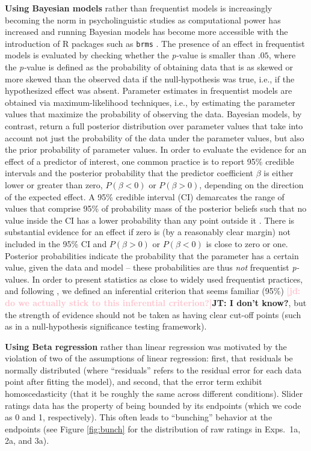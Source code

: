 \documentclass[11pt,fleqn]{article}
\newcommand{\jd}[1]{\textbf{\textcolor{Pink}{[jd: #1]}}}
\newcommand{\6}{\mbox{$[\hspace*{-.6mm}[$}}
\newcommand{\9}{\mbox{$]\hspace*{-.6mm}]$}}
\newcommand{\jt}[1]{\textbf{\color{blue}JT: #1}}
\begin{document}
\textbf{Using Bayesian models} rather than frequentist models is increasingly becoming the norm in psycholinguistic studies as computational power has increased and running Bayesian models has become more accessible with the introduction of R packages such as \verb|brms| \citep{buerkner2017}. The presence of an effect in frequentist models is evaluated by checking whether the {\em p-}value is smaller than $.05$, where the {\em p-}value is defined as the probability of obtaining data that is as skewed or more skewed than the observed data if the null-hypothesis was true, i.e., if the hypothesized effect was absent. Parameter estimates in frequentist models are obtained via maximum-likelihood techniques, i.e., by estimating the parameter values that maximize the probability of observing the data. Bayesian models, by contrast, return a full posterior distribution over parameter values that take into account not just the probability of the data under the parameter values, but also the prior probability of parameter values. In order to evaluate the evidence for an effect of a predictor of interest, one common practice is to report 95\% credible intervals and the posterior probability that the predictor coefficient $\beta$ is either lower or greater than zero, $P(\beta < 0)$ or $P(\beta > 0)$, depending on the direction of the expected effect. A 95\% credible interval (CI) demarcates the range of values that comprise 95\% of probability mass of the posterior beliefs such that no value inside the CI has a lower probability than any point outside it \citep{Jaynes1976, Morey2016}. There is substantial evidence for an effect if zero is (by a reasonably clear margin) not included in the 95\% CI and $P(\beta > 0)$ or $P(\beta < 0)$ is close to zero or one. Posterior probabilities indicate the probability that the parameter has a certain value, given the data and model -- these probabilities are thus \emph{not} frequentist {\em p-}values. In order to present statistics as close to widely used frequentist practices, and following \citealt{Nicenboim2016}, we defined an inferential criterion that seems familiar (95\%) \jd{do we actually stick to this inferential criterion?}\jt{I don't know?}, but the strength of evidence should not be taken as having clear cut-off points (such as in a null-hypothesis significance testing framework).

\textbf{Using Beta regression} rather than linear regression was motivated by the violation of two of the  assumptions of linear regression: first, that residuals be normally distributed (where ``residuals'' refers to the residual error for each data point after fitting the model), and second, that the error term exhibit homoscedasticity (that it be roughly the same across different conditions). Slider ratings data has the property of being bounded by its endpoints (which we code as 0 and 1, respectively). This often leads to ``bunching'' behavior at the endpoints (see Figure \ref{fig:bunch} for the distribution of raw ratings in Exps.~1a, 2a, and 3a). 
\end{document}

